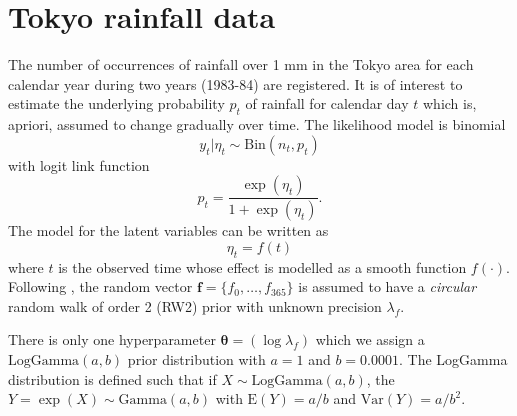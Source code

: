 \documentclass[a4paper,11pt]{article}
\def\mm#1{\ensuremath{\boldsymbol{#1}}} %
\begin{document}


\section*{Tokyo rainfall data}
 The number of occurrences of rainfall over 1 mm in the Tokyo area
    for each calendar year during two years (1983-84) are
    registered. It is of interest to estimate the underlying
    probability $p_t$ of rainfall for calendar day $t$ which is,
    apriori, assumed to change gradually over time. The likelihood
    model is binomial
    \[y_t|\eta_t\sim\text{Bin}(n_t,p_t)\] with logit link function
    \[p_t=\frac{\exp(\eta_t)}{1+\exp(\eta_t)}.\] The model for the
    latent variables can be written as
    \[\eta_t=f(t)\]
    where $t$ is the observed time whose effect is modelled as a
    smooth function $f(\cdot)$. Following \cite{book80}, the random
    vector $\mm{f}=\{f_0,\dots,f_{365}\}$ is assumed to have a {\it
        circular} random walk of order 2 (RW2) prior with unknown
    precision $\lambda_f$.

    There is only one hyperparameter $\mm{\theta}=(\log\lambda_f)$
    which we assign a $\text{LogGamma}(a,b)$ prior distribution with
    $a=1$ and $b=0.0001$. The LogGamma distribution is defined such
    that if $X\sim\text{LogGamma}(a,b)$, the
    $Y=\exp(X)\sim\text{Gamma}(a,b)$ with $\text{E}(Y)=a/b$ and
    $\text{Var}(Y)=a/b^2$.

\small \newpage
\end{document}
